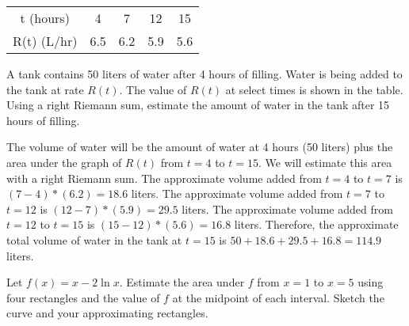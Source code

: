 \begin{Exercise}[label=rsum2]
	\begin{center}
		\begin{tabular}{c|c|c|c|c}
			t (hours) & 4 & 7 & 12 & 15\\
			R(t) (L/hr) & 6.5 & 6.2 & 5.9 & 5.6\\
		\end{tabular}
	\end{center}
	A tank contains 50 liters of water after 4 hours of filling. Water is being added to the tank at rate $R(t)$. The value of $R(t)$ at select times is shown in the table. Using a right Riemann sum, estimate the amount of water in the tank after 15 hours of filling. 
\end{Exercise}

\begin{Answer}[ref=rsum2]
	The volume of water will be the amount of water at 4 hours (50 liters) plus the area under the graph of $R(t)$ from $t=4$ to $t=15$. We will estimate this area with a right Riemann sum. The approximate volume added from $t=4$ to $t=7$ is $(7-4)*(6.2) = 18.6$ liters. The approximate volume added from $t=7$ to $t=12$ is $(12-7)*(5.9)=29.5$ liters. The approximate volume added from $t=12$ to $t=15$ is $(15-12)*(5.6) = 16.8$ liters. Therefore, the approximate total volume of water in the tank at $t=15$ is $50 + 18.6 + 29.5 + 16.8 = 114.9$ liters. 
\end{Answer}

\begin{Exercise}[label=rsum3]
	Let $f(x) = x-2\ln{x}$. Estimate the area under $f$ from $x=1$ to $x=5$ using four rectangles and the value of $f$ at the midpoint of each interval. Sketch the curve and your approximating rectangles.
\end{Exercise}


